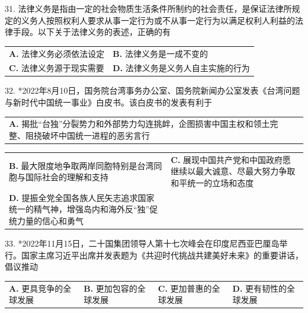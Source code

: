\documentclass[UTF8,11pt]{ctexart}
\begin{document}
31. 法律义务是指由一定的社会物质生活条件所制约的社会责任，是保证法律所规定的义务人按照权利人要求从事一定行为或不从事一定行为以满足权利人利益的法律手段。以下关于法律义务的表述，正确的有


\begin{center}\begin{tabular}{>{\raggedright\arraybackslash}p{\dimexpr(\linewidth-4\tabcolsep)/2\relax}>{\raggedright\arraybackslash}p{\dimexpr(\linewidth-4\tabcolsep)/2\relax}}
\textbf{A.} 法律义务必须依法设定 & \textbf{B.} 法律义务是一成不变的\\[.35em]
\textbf{C.} 法律义务源于现实需要 & \textbf{D.} 法律义务是义务人自主实施的行为\\[.35em]\end{tabular}\end{center}

32. *2022年8月10日，国务院台湾事务办公室、国务院新闻办公室发表《台湾问题与新时代中国统一事业》白皮书。该白皮书的发表有利于


\begin{center}\begin{tabular}{>{\raggedright\arraybackslash}p{\dimexpr(\linewidth-4\tabcolsep)/2\relax}>{\raggedright\arraybackslash}p{\dimexpr(\linewidth-4\tabcolsep)/2\relax}}
\textbf{A.} 揭批“台独”分裂势力和外部势力勾连挑衅，企图损害中国主权和领土完整、阻挠破坏中国统一进程的恶劣言行 & \\[.35em]\end{tabular}\end{center}

\begin{center}\begin{tabular}{>{\raggedright\arraybackslash}p{\dimexpr(\linewidth-4\tabcolsep)/2\relax}>{\raggedright\arraybackslash}p{\dimexpr(\linewidth-4\tabcolsep)/2\relax}}
\textbf{B.} 最大限度地争取两岸同胞特别是台湾同胞与国际社会的理解和支持 & \textbf{C.} 展现中国共产党和中国政府愿继续以最大诚意、尽最大努力争取和平统一的立场和态度\\[.35em]
\textbf{D.} 提振全党全国各族人民矢志追求国家统一的精气神，增强岛内和海外反“独”促统力量的信心和勇气 & \\[.35em]\end{tabular}\end{center}

33. *2022年11月15日，二十国集团领导人第十七次峰会在印度尼西亚巴厘岛举行。国家主席习近平出席并发表题为《共迎时代挑战共建美好未来》的重要讲话，倡议推动


\begin{center}\begin{tabular}{>{\raggedright\arraybackslash}p{\dimexpr(\linewidth-8\tabcolsep)/4\relax}>{\raggedright\arraybackslash}p{\dimexpr(\linewidth-8\tabcolsep)/4\relax}>{\raggedright\arraybackslash}p{\dimexpr(\linewidth-8\tabcolsep)/4\relax}>{\raggedright\arraybackslash}p{\dimexpr(\linewidth-8\tabcolsep)/4\relax}}
\textbf{A.} 更具竞争的全球发展 & \textbf{B.} 更加包容的全球发展 & \textbf{C.} 更加普惠的全球发展 & \textbf{D.} 更有韧性的全球发展\\[.35em]\end{tabular}\end{center}
\end{document}
